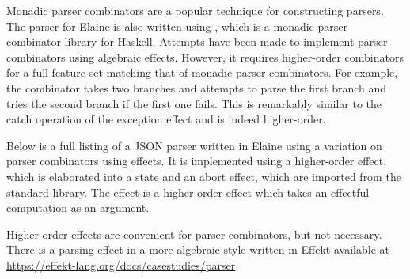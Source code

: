 Monadic parser combinators \autocite{hutton_monadic_1996} are a popular technique for constructing parsers. The parser for Elaine is also written using , which is a monadic parser combinator library for Haskell. Attempts have been made to implement parser combinators using algebraic effects. However, it requires higher-order combinators for a full feature set matching that of monadic parser combinators. For example, the  combinator takes two branches and attempts to parse the first branch and tries the second branch if the first one fails. This is remarkably similar to the catch operation of the exception effect and is indeed higher-order.

Below is a full listing of a JSON parser written in Elaine using a variation on parser combinators using effects. It is implemented using a higher-order  effect, which is elaborated into a state and an abort effect, which are imported from the standard library. The  effect is a higher-order effect which takes an effectful computation as an argument.

Higher-order effects are convenient for parser combinators, but not necessary. There is a parsing effect in a more algebraic style written in Effekt available at \url{https://effekt-lang.org/docs/casestudies/parser} 

